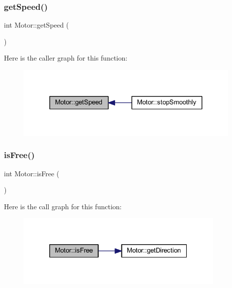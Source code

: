 \subsubsection{\texorpdfstring{get\+Speed()}{getSpeed()}}
{\footnotesize\ttfamily int Motor\+::get\+Speed (\begin{DoxyParamCaption}{ }\end{DoxyParamCaption})}

Here is the caller graph for this function\+:
\nopagebreak
\begin{figure}[H]
\begin{center}
\leavevmode
\includegraphics[width=312pt]{d1/d6b/class_motor_a4d03ea62bd9f5579d4fbe16d10462962_icgraph}
\end{center}
\end{figure}
\mbox{\label{class_motor_a17a9259b14a7e71ae625f47ec8ef0178}} 
\subsubsection{\texorpdfstring{is\+Free()}{isFree()}}
{\footnotesize\ttfamily int Motor\+::is\+Free (\begin{DoxyParamCaption}{ }\end{DoxyParamCaption})}

Here is the call graph for this function\+:
\nopagebreak
\begin{figure}[H]
\begin{center}
\leavevmode
\includegraphics[width=289pt]{d1/d6b/class_motor_a17a9259b14a7e71ae625f47ec8ef0178_cgraph}
\end{center}
\end{figure}
\mbox{\label{class_motor_a7429cc5bd67dd69077008674eda80f2d}} 
